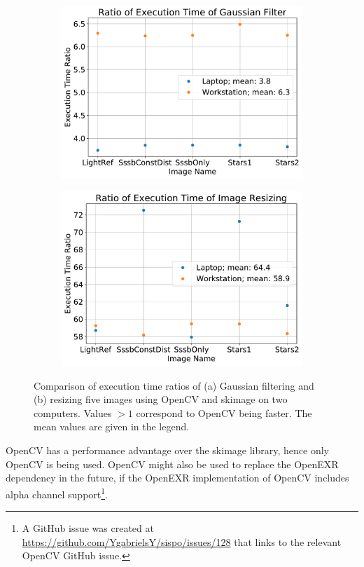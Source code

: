 \begin{figure}[htb]
    \centering
    \begin{subfigure}[b]{0.47\textwidth}
        \centering
        \includegraphics[width=\textwidth]{doc/thesis/0_figures/cv_skimage/Comparison_Gaussian}
        \caption{}
        \label{fig:bm_comparison_gauss}
    \end{subfigure}
    \begin{subfigure}[b]{0.47\textwidth}
        \centering
        \includegraphics[width=\textwidth]{doc/thesis/0_figures/cv_skimage/Comparison_Resize}
        \caption{}
        \label{fig:bm_comparison_res}
    \end{subfigure}
    \caption{Comparison of execution time ratios of (a) Gaussian filtering and (b) resizing five images using OpenCV and \gls{skimage} on two computers. Values $> 1$ correspond to OpenCV being faster. The mean values are given in the legend.}
    \label{fig:bm_comparison}
\end{figure}

OpenCV has a performance advantage over the \gls{skimage} library, hence only OpenCV is being used. OpenCV might also be used to replace the OpenEXR dependency in the future, if the OpenEXR implementation of OpenCV includes alpha channel support\footnote{A GitHub issue was created at \url{https://github.com/YgabrielsY/sispo/issues/128} that links to the relevant OpenCV GitHub issue.}.